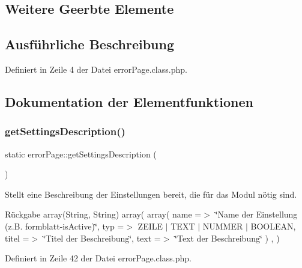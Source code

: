 \subsection*{Weitere Geerbte Elemente}


\subsection{Ausführliche Beschreibung}


Definiert in Zeile 4 der Datei error\+Page.\+class.\+php.



\subsection{Dokumentation der Elementfunktionen}
\mbox{\label{classerror_page_aa6b1e30ac079522d33972499aa5d9386}} 
\subsubsection{\texorpdfstring{get\+Settings\+Description()}{getSettingsDescription()}}
{\footnotesize\ttfamily static error\+Page\+::get\+Settings\+Description (\begin{DoxyParamCaption}{ }\end{DoxyParamCaption})\hspace{0.3cm}{\ttfamily [static]}}

Stellt eine Beschreibung der Einstellungen bereit, die für das Modul nötig sind. \begin{DoxyReturn}{Rückgabe}
array(\+String, String) array( array( \textquotesingle{}name\textquotesingle{} =$>$ \char`\"{}\+Name der Einstellung (z.\+B. formblatt-\/is\+Active)\char`\"{}, \textquotesingle{}typ\textquotesingle{} =$>$ Z\+E\+I\+LE $\vert$ T\+E\+XT $\vert$ N\+U\+M\+M\+ER $\vert$ B\+O\+O\+L\+E\+AN, \textquotesingle{}titel\textquotesingle{} =$>$ \char`\"{}\+Titel der Beschreibung\char`\"{}, \textquotesingle{}text\textquotesingle{} =$>$ \char`\"{}\+Text der Beschreibung\char`\"{} ) , ) 
\end{DoxyReturn}


Definiert in Zeile 42 der Datei error\+Page.\+class.\+php.

\mbox{\label{classerror_page_ab2840ad0c3ff7206f01842d4c738ff33}} 
